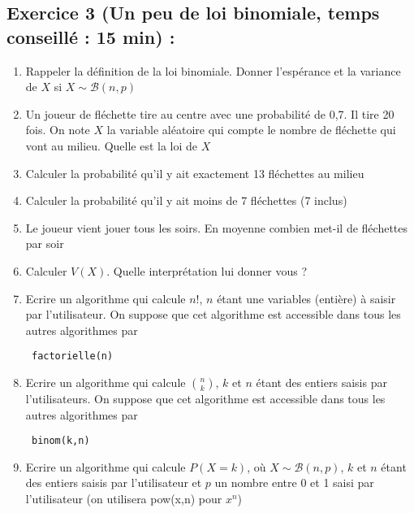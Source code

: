 \subsection*{Exercice 3 (Un peu de loi binomiale, temps conseillé : 15 min) : }
\begin{enumerate}
\item Rappeler la définition de la loi binomiale. Donner l'espérance et la variance de $X$ si $X \sim \mathscr{B}(n,p)$
\item Un joueur de fléchette tire au centre avec une probabilité de 0,7. Il tire 20 fois. On note $X$ la variable aléatoire qui compte le nombre de fléchette qui vont au milieu. Quelle est la loi de $X$
\item Calculer la probabilité qu'il y ait exactement 13 fléchettes au milieu
\item Calculer la probabilité qu'il y ait moins de 7 fléchettes (7 inclus)
\item Le joueur vient jouer tous les soirs. En moyenne combien met-il de fléchettes par soir
\item Calculer $V(X)$. Quelle interprétation lui donner vous ?
\item Ecrire un algorithme qui calcule $n!$, $n$ étant une variables (entière) à saisir par l'utilisateur. On suppose que cet algorithme est accessible dans tous les autres algorithmes par \begin{verbatim} factorielle(n) \end{verbatim}
\item Ecrire un algorithme qui calcule $\binom{n}{k}$, $k$ et $n$ étant des entiers saisis par l'utilisateurs. On suppose que cet algorithme est accessible dans tous les autres algorithmes par \begin{verbatim} binom(k,n) \end{verbatim}
\item Ecrire un algorithme qui calcule $P(X =k)$, où $X\sim \mathscr{B}(n,p)$, $k$ et $n$ étant des entiers saisis par l'utilisateur et $p$ un nombre entre 0 et 1 saisi par l'utilisateur (on utilisera pow(x,n) pour $x^n$)
\end{enumerate}
